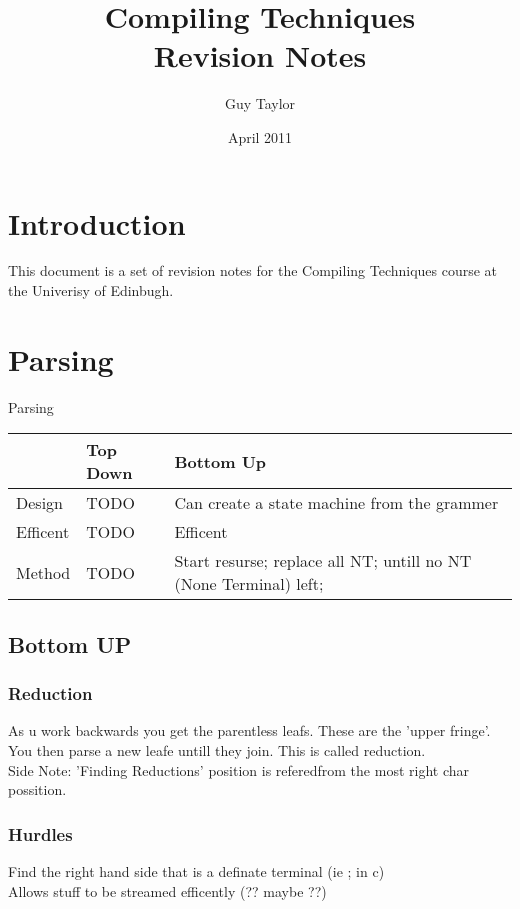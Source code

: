 \documentclass[11pt,twoside,a4paper]{article}
\begin{document}
  
  \title{Compiling Techniques \\Revision Notes}
  \author{Guy Taylor}
  \date{April 2011}
  
  \maketitle
  
  \tableofcontents
  
  \section{Introduction}
    This document is a set of revision notes for the Compiling Techniques \cite{ct_home} course at the Univerisy of Edinbugh.
  
  \clearpage
  \section{Parsing}
    Parsing
    
    \begin{center}\begin{tabular}{l|l|l}
       & Top Down & Bottom Up \\ \hline
      Design & TODO & Can create a state machine from the grammer \\
      Efficent & TODO & Efficent \\
      Method & TODO & Start resurse; replace all NT; untill no NT (None Terminal) left; \\
    \end{tabular}\end{center}
    
    \subsection{Bottom UP}
      \subsubsection{Reduction}
      As u work backwards you get the parentless leafs. These are the 'upper fringe'. You then parse a new leafe untill they join. This is called reduction. \\
      Side Note: 'Finding Reductions' position is referedfrom the most right char possition.
      
      \subsubsection{Hurdles}
        Find the right hand side that is a definate terminal (ie ; in c) \\
        Allows stuff to be streamed efficently (?? maybe ??)
      
\end{document}

